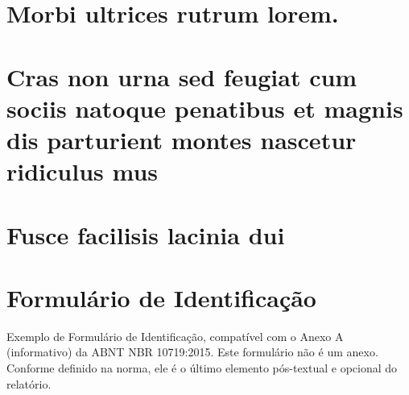 \documentclass[
	12pt,				%
	oneside,            %
	a4paper,			%
	english,			%
	french,				%
	spanish,			%
	brazil,				%
	]{abntex2}
\begin{document}
\begin{anexosenv}

\partanexos

\chapter{Morbi ultrices rutrum lorem.}
\lipsum[30]

\chapter{Cras non urna sed feugiat cum sociis natoque penatibus et magnis dis
parturient montes nascetur ridiculus mus}

\lipsum[31]

\chapter{Fusce facilisis lacinia dui}

\lipsum[32]

\end{anexosenv}



\printindex

\chapter*[Formulário de Identificação]{Formulário de Identificação}
\label{formulado-identificacao}

Exemplo de Formulário de Identificação, compatível com o Anexo A (informativo)
da ABNT NBR 10719:2015. Este formulário não é um anexo. Conforme definido na
norma, ele é o último elemento pós-textual e opcional do relatório.

\bigskip
\end{document}
